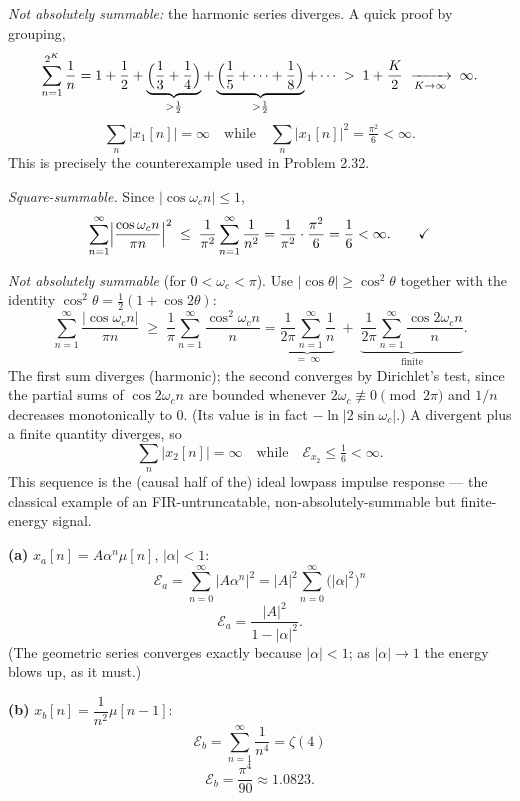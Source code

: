 \emph{Not absolutely summable:} the harmonic series diverges. A quick proof by grouping,
\[
\sum_{n=1}^{2^{K}}\frac1n
=1+\frac12+\underbrace{\Bigl(\frac13+\frac14\Bigr)}_{>\frac12}
      +\underbrace{\Bigl(\frac15+\cdots+\frac18\Bigr)}_{>\frac12}+\cdots
\;>\;1+\frac{K}{2}\;\xrightarrow[K\to\infty]{}\;\infty .
\]
\[
\boxed{\;\sum_n|x_1[n]|=\infty\quad\text{while}\quad\sum_n|x_1[n]|^{2}=\tfrac{\pi^2}{6}<\infty .\;}
\]
This is precisely the counterexample used in Problem 2.32.


\emph{Square-summable.} Since $|\cos\omega_c n|\le 1$,
\[
\sum_{n=1}^{\infty}\Bigl|\frac{\cos\omega_c n}{\pi n}\Bigr|^{2}
\;\le\;\frac{1}{\pi^{2}}\sum_{n=1}^{\infty}\frac{1}{n^{2}}
=\frac{1}{\pi^{2}}\cdot\frac{\pi^{2}}{6}=\frac16<\infty . \qquad\checkmark
\]

\emph{Not absolutely summable} (for $0<\omega_c<\pi$). Use $|\cos\theta|\ge\cos^{2}\theta$
together with the identity $\cos^{2}\theta=\tfrac12(1+\cos 2\theta)$:
\[
\sum_{n=1}^{\infty}\frac{|\cos\omega_c n|}{\pi n}
\;\ge\;\frac{1}{\pi}\sum_{n=1}^{\infty}\frac{\cos^{2}\omega_c n}{n}
=\underbrace{\frac{1}{2\pi}\sum_{n=1}^{\infty}\frac{1}{n}}_{=\;\infty}
\;+\;\underbrace{\frac{1}{2\pi}\sum_{n=1}^{\infty}\frac{\cos 2\omega_c n}{n}}_{\text{finite}} .
\]
The first sum diverges (harmonic); the second converges by Dirichlet's test, since the partial
sums of $\cos 2\omega_c n$ are bounded whenever $2\omega_c\not\equiv 0 \pmod{2\pi}$ and $1/n$
decreases monotonically to $0$. (Its value is in fact $-\ln|2\sin\omega_c|$.) A divergent plus
a finite quantity diverges, so
\[
\boxed{\;\sum_{n}|x_2[n]|=\infty\quad\text{while}\quad \mathcal{E}_{x_2}\le \tfrac16<\infty .\;}
\]
This sequence is the (causal half of the) ideal lowpass impulse response --- the classical
example of an FIR-untruncatable, non-absolutely-summable but finite-energy signal.


\textbf{(a)} $x_a[n]=A\alpha^{n}\mu[n]$, $|\alpha|<1$:
\[
\mathcal{E}_a=\sum_{n=0}^{\infty}\bigl|A\alpha^{n}\bigr|^{2}
=|A|^{2}\sum_{n=0}^{\infty}\bigl(|\alpha|^{2}\bigr)^{n}
\]
\[
\boxed{\;\mathcal{E}_a=\frac{|A|^{2}}{1-|\alpha|^{2}} .\;}
\]
(The geometric series converges exactly because $|\alpha|<1$; as $|\alpha|\to1$ the energy
blows up, as it must.)

\textbf{(b)} $x_b[n]=\dfrac{1}{n^{2}}\mu[n-1]$:
\[
\mathcal{E}_b=\sum_{n=1}^{\infty}\frac{1}{n^{4}}=\zeta(4)
\]
\[
\boxed{\;\mathcal{E}_b=\frac{\pi^{4}}{90}\approx 1.0823 .\;}
\]

